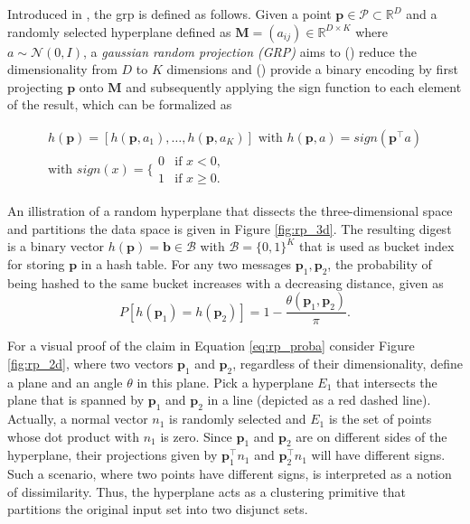 \documentclass[../../../main.tex]{subfiles}
\begin{document}
Introduced in \cite{charikar2002similarity}, the \gls{grp} is defined as follows. Given a point $\bm{p} \in \mathcal{P} \subset \mathbb{R}^D$ and a randomly selected hyperplane defined as $\bm{M}=(a_{ij}) \in \mathbb{R}^{D \times K}$ where $a \sim \mathcal{N}(0, I)$, a \textit{gaussian random projection (GRP)} aims to () reduce the dimensionality from $D$ to $K$ dimensions and () provide a binary encoding by first projecting $\bm{p}$ onto $\bm{M}$ and subsequently applying the sign function to each element of the result, which can be formalized as

\begin{gather}\label{eq:grp_sign}
    h(\bm{p}) = [h(\bm{p}, a_1), \dots, h(\bm{p}, a_K)] \text{ with } h(\bm{p}, a) = sign(\bm{p}^\top a) \\
    \text{with } sign(x) = \Biggl\{ \begin{array}{lc}
        0 & \text{if } x < 0, \\
        1 & \text{if } x \geq 0.
    \end{array}
\end{gather}

An illistration of a random hyperplane that dissects the three-dimensional space and partitions the data space is given in Figure \ref{fig:rp_3d}. The resulting digest is a binary vector $h(\bm{p}) = \bm{b} \in \mathcal{B}$ with $\mathcal{B} = \{0, 1\}^K$ that is used as bucket index for storing $\bm{p}$ in a hash table. For any two messages $\bm{p}_1, \bm{p}_2$, the probability of being hashed to the same bucket increases with a decreasing distance, given as
\begin{equation}\label{eq:rp_proba}
    P[h(\bm{p}_1) = h(\bm{p}_2)] = 1 - \frac{\theta(\bm{p}_1, \bm{p}_2)}{\pi}.
\end{equation}

For a visual proof of the claim in Equation \ref{eq:rp_proba} consider Figure \ref{fig:rp_2d}, where two vectors $\bm{p}_1$ and $\bm{p}_2$, regardless of their dimensionality, define a plane and an angle $\theta$ in this plane. Pick a hyperplane $E_1$ that intersects the plane that is spanned by $\bm{p}_1$ and $\bm{p}_2$ in a line (depicted as a red dashed line). Actually, a normal vector $n_1$ is randomly selected and $E_1$ is the set of points whose dot product with $n_1$ is zero. Since $\bm{p}_1$ and $\bm{p}_2$ are on different sides of the hyperplane, their projections given by $\bm{p}_1^\top n_1$ and  $\bm{p}_2^\top n_1$ will have different signs. Such a scenario, where two points have different signs, is interpreted as a notion of dissimilarity. Thus, the hyperplane acts as a clustering primitive that partitions the original input set into two disjunct sets.
\end{document}
